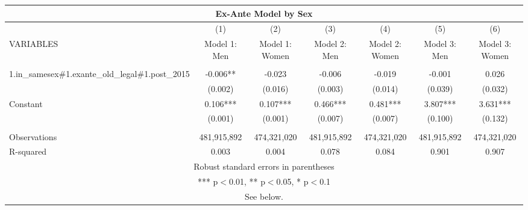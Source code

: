 \begin{tabular}{lcccccc}
\multicolumn{7}{c}{Ex-Ante Model by Sex} \\ \hline
 & (1) & (2) & (3) & (4) & (5) & (6) \\
VARIABLES & Model 1: Men & Model 1: Women & Model 2: Men & Model 2: Women & Model 3: Men & Model 3: Women \\ \hline
 &  &  &  &  &  &  \\
1.in\_samesex\#1.exante\_old\_legal\#1.post\_2015 & -0.006** & -0.023 & -0.006 & -0.019 & -0.001 & 0.026 \\
 & (0.002) & (0.016) & (0.003) & (0.014) & (0.039) & (0.032) \\
Constant & 0.106*** & 0.107*** & 0.466*** & 0.481*** & 3.807*** & 3.631*** \\
 & (0.001) & (0.001) & (0.007) & (0.007) & (0.100) & (0.132) \\
 &  &  &  &  &  &  \\
Observations & 481,915,892 & 474,321,020 & 481,915,892 & 474,321,020 & 481,915,892 & 474,321,020 \\
 R-squared & 0.003 & 0.004 & 0.078 & 0.084 & 0.901 & 0.907 \\ \hline
\multicolumn{7}{c}{ Robust standard errors in parentheses} \\
\multicolumn{7}{c}{ *** p$<$0.01, ** p$<$0.05, * p$<$0.1} \\
\multicolumn{7}{c}{ See below.} \\
\end{tabular}
